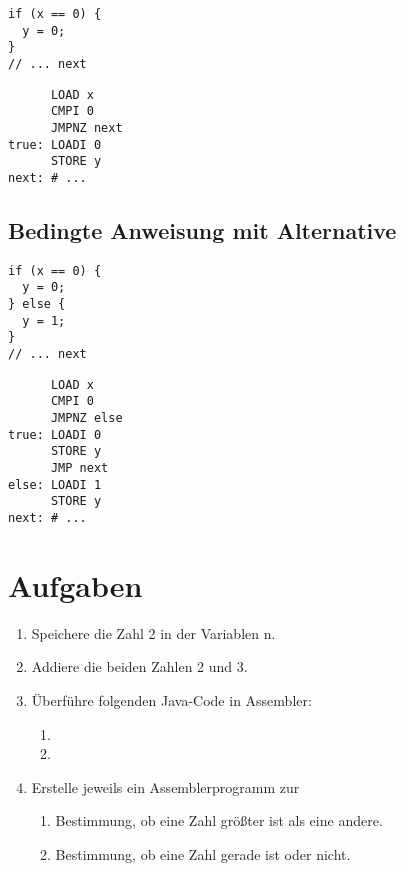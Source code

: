 \documentclass{lehramt-informatik-haupt}
\begin{document}
\begin{multicols}{2}
\begin{verbatim}
if (x == 0) {
  y = 0;
}
// ... next
\end{verbatim}

\columnbreak

\begin{verbatim}
      LOAD x
      CMPI 0
      JMPNZ next
true: LOADI 0
      STORE y
next: # ...
\end{verbatim}
\end{multicols}

%

\subsection{Bedingte Anweisung mit Alternative}

\begin{multicols}{2}
\begin{verbatim}
if (x == 0) {
  y = 0;
} else {
  y = 1;
}
// ... next
\end{verbatim}

\columnbreak

\begin{verbatim}
      LOAD x
      CMPI 0
      JMPNZ else
true: LOADI 0
      STORE y
      JMP next
else: LOADI 1
      STORE y
next: # ...
\end{verbatim}
\end{multicols}

%

\section{Aufgaben}

\begin{enumerate}
\item Speichere die Zahl 2 in der Variablen n.

\item Addiere die beiden Zahlen 2 und 3.

\item Überführe folgenden Java-Code in Assembler:

\begin{enumerate}
\item {}
\item {}
\end{enumerate}

\item Erstelle jeweils ein Assemblerprogramm zur

\begin{enumerate}
\item Bestimmung, ob eine Zahl größter ist als eine andere.

\item Bestimmung, ob eine Zahl gerade ist oder nicht.
\end{enumerate}
\end{enumerate}

\literatur
\end{document}
